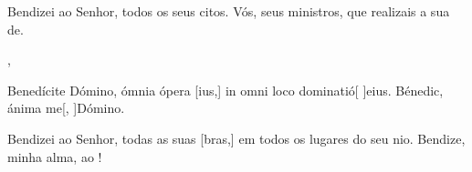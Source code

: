 {{\item Bendizei ao Senhor, todos os seus citos. {\ResponsoriumC} Vós, seus ministros, que realizais a sua \-de.~\Responsorium},
%
{\item Benedícite Dómino, ómnia ópera [ius,] in omni loco dominatió[ ]{e}ius. {\ResponsoriumC} Bénedic, ánima me[, ]{Dó}mino.~\Responsorium}%
{\item Bendizei ao Senhor, todas as suas [bras,] em todos os lugares do seu nio. {\ResponsoriumC} Bendize, minha alma, ao !~\Responsorium}
}